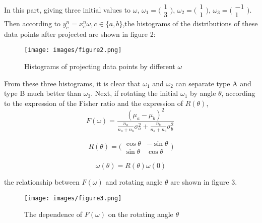 \documentclass[a4paper, 12pt]{article}
\begin{document}
    In this part, giving three initial values to $\omega$, 
    $\omega_1 = 
    \Big(
    \begin{array}{cc}
      1 \\
      3
    \end{array}
    \Big)$,
    $\omega_2 = 
    \Big(
    \begin{array}{cc}
      1 \\
      1
    \end{array}
    \Big)$,
    $\omega_3 = 
    \Big(
    \begin{array}{cc}
      -1 \\
      1
    \end{array}
    \Big)$. Then according to $y^n_c = x^n_c\omega, c\in\{a,b\}$,the histograms of the distributions of these data points after projected are shown in figure 2:
    \begin{figure}[h]
      \texttt{[image: images/figure2.png]}
      \centering
      \caption{Histograms of projecting data points by different $\omega$}
    \end{figure}

    From these three histograms, it is clear that $\omega_1$ and $\omega_2$ can separate type A and type B much better than $\omega_3$.
    Next, if rotating the initial $\omega_1$ by angle $\theta$, according to the expression of the Fisher ratio and the expression of $R(\theta)$,
    \begin{equation*}
      F(\omega) = \frac{(\mu_a - \mu_b)^2}{\frac{n_a}{n_a + n_b}\sigma^2_a + \frac{n_b}{n_a + n_b}\sigma^2_b} \
    \end{equation*}

    \begin{equation*}
    R(\theta) = \bigg(
    \begin{array}{cc}
    \cos\theta & -\sin\theta \\
    \sin\theta & \cos\theta
    \end{array}
    \bigg)
    \end{equation*}

    \begin{equation*}
    \omega(\theta) = R(\theta)\omega(0)
    \end{equation*}
    
    the relationship between $F(\omega)$ and rotating angle $\theta$ are shown in figure 3.
    \begin{figure}[h]
    \centering
    \texttt{[image: images/figure3.png]}
    \caption{The dependence of $F(\omega)$  on the rotating angle $\theta$}
    \end{figure}
\end{document}
